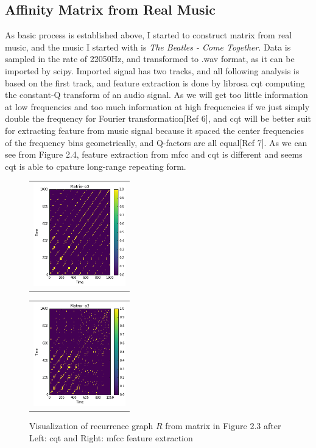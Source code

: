 \documentclass[final]{siamltexmm}
\begin{document}
\subsection{Affinity Matrix from Real Music}
As basic process is established above, I started to construct matrix from real music, and the music I started with is \textit{The Beatles - Come Together}. Data is sampled in the rate of 22050Hz, and transformed to .wav format, as it can be imported by scipy. Imported signal has two tracks, and all following analysis is based on the first track, and feature extraction is done by librosa cqt computing the constant-Q transform of an audio signal. As we will get too little information at low frequencies and too much information at high frequencies if we just simply double the frequency for Fourier transformation[Ref 6], and cqt will be better suit for extracting feature from music signal because it spaced the center frequencies of the frequency bins geometrically, and Q-factors are all equal[Ref 7]. As we can see from Figure 2.4, feature extraction from mfcc and cqt is different and seems cqt is able to cpature long-range repeating form.

\begin{figure}[H]
\centering
\begin{subfigure}
  \begin{tabular}{c}
  \includegraphics[width=40mm]{./figure/cqt.png}
  \end{tabular}{}
\end{subfigure}
  \begin{tabular}{c}
  \includegraphics[width=40mm]{./figure/mfcc.png}
  \end{tabular}{}
\begin{subfigure}
\end{subfigure}
\caption{Visualization of recurrence graph $R$ from matrix in Figure 2.3 after Left: cqt and Right: mfcc feature extraction}
\end{figure}
\end{document}
